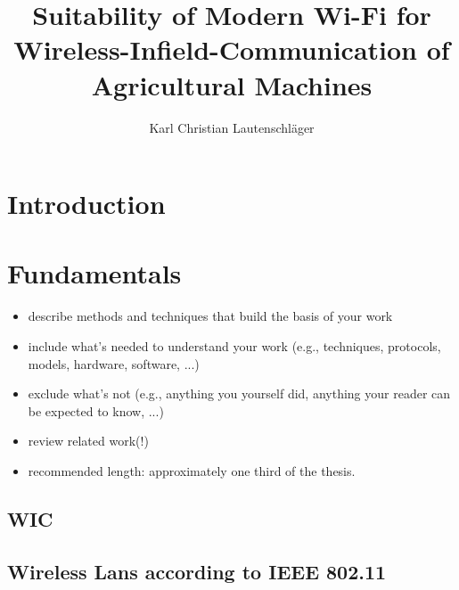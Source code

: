 \documentclass[]{nsm-thesis}
\author{Karl Christian Lautenschläger}
\title{Suitability of Modern Wi-Fi for Wireless-Infield-Communication of Agricultural Machines}
\begin{document}

\maketitle

\cleardoublepage





\tableofcontents

\cleardoublepage
{}


\chapter{Introduction}
\label{sec:introduction}


\chapter{Fundamentals}
\label{sec:fundamentals}



\begin{itemize}
\item describe methods and techniques that build the basis of your work
\item include what's needed to understand your work (e.g., techniques, protocols, models, hardware, software, ...)
\item exclude what's not (e.g., anything you yourself did, anything your reader can be expected to know, ...)
\item review related work(!)
\item recommended length: approximately one third of the thesis.
\end{itemize}

\section{\acl{WIC}}





\section{Wireless Lans according to IEEE 802.11}
\end{document}
